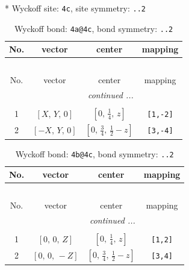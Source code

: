 \documentclass[fleqn,8pt]{jsarticle}
\begin{document}
* Wyckoff site: {\tt 4c}, site symmetry: {\tt ..2}
\renewcommand{\arraystretch}{1.2}
\begin{longtable}{cccc}
\caption{Wyckoff bond: {\tt 4a@4c}, bond symmetry: {\tt ..2}}
 \\
 \hline \hline
No. & vector & center & mapping \\ \hline \endfirsthead

\multicolumn{3}{l}{\tablename\ \thetable{}} \\
 \hline \hline
No. & vector & center & mapping \\ \hline \endhead

 \hline \hline
\multicolumn{3}{r}{\footnotesize\it continued ...} \\ \endfoot

 \hline \hline
\multicolumn{3}{r}{} \\ \endlastfoot

1 & $\left[ X,\, Y,\, 0 \right]$ & $\left[ 0,\, \frac{1}{4},\, z \right]$ & {\tt [1,-2]} \\ \hline
2 & $\left[ - X,\, Y,\, 0 \right]$ & $\left[ 0,\, \frac{3}{4},\, \frac{1}{2} - z \right]$ & {\tt [3,-4]} \\
\end{longtable}
\renewcommand{\arraystretch}{1.2}
\begin{longtable}{cccc}
\caption{Wyckoff bond: {\tt 4b@4c}, bond symmetry: {\tt ..2}}
 \\
 \hline \hline
No. & vector & center & mapping \\ \hline \endfirsthead

\multicolumn{3}{l}{\tablename\ \thetable{}} \\
 \hline \hline
No. & vector & center & mapping \\ \hline \endhead

 \hline \hline
\multicolumn{3}{r}{\footnotesize\it continued ...} \\ \endfoot

 \hline \hline
\multicolumn{3}{r}{} \\ \endlastfoot

1 & $\left[ 0,\, 0,\, Z \right]$ & $\left[ 0,\, \frac{1}{4},\, z \right]$ & {\tt [1,2]} \\ \hline
2 & $\left[ 0,\, 0,\, - Z \right]$ & $\left[ 0,\, \frac{3}{4},\, \frac{1}{2} - z \right]$ & {\tt [3,4]} \\
\end{longtable}
\renewcommand{\arraystretch}{1.2}
\end{document}
